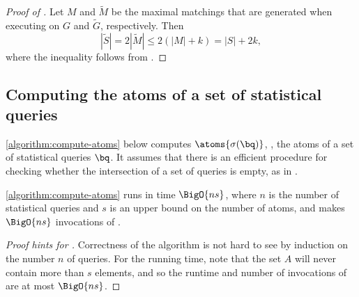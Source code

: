 \documentclass{toc}
\begin{document}

\begin{proof}[Proof of ]
	Let $M$ and $\widetilde{M}$ be the maximal matchings that are generated when executing  on $G$ and $\widetilde{G}$, respectively. 
	Then 
	\[
		|\widetilde{S}| = 2|\widetilde{M}| \leq 2(|M| + k) = |S| + 2k,
	\]
	where the inequality follows from .
\end{proof}

%
\subsection{Computing the atoms of a set of statistical queries} %
\label{section:compute-atoms}

\cref{algorithm:compute-atoms} below computes $\atoms{\sigma(\bq)}$, \ie, the atoms of a set of statistical queries $\bq$. It assumes that there is an efficient procedure {} for checking whether the intersection of a set of queries is empty, as in .

\cref{algorithm:compute-atoms} runs in time $\BigO{ns}$, where $n$ is the number of statistical queries and $s$ is an upper bound on the number of atoms, and makes $\BigO{ns}$ invocations of {}.

\begin{proof}[Proof hints for ] 
	Correctness of the algorithm is not hard to see by induction on the number $n$ of queries. For the running time, note that the set $A$ will never contain more than $s$ elements, and so the runtime and number of invocations of {} are at most $\BigO{ns}$.
\end{proof}
\end{document}
